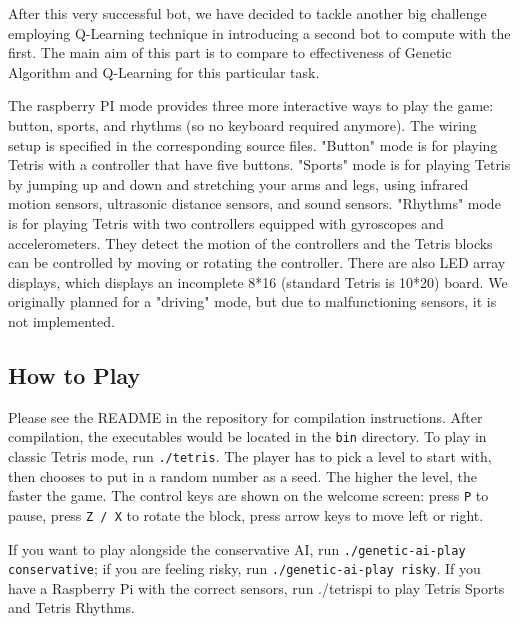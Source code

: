 \documentclass[11pt]{article}
\begin{document}
\begin{flushleft}
After this very successful bot, we have decided to tackle another big challenge employing Q-Learning technique in introducing a second bot to compute with the first. The main aim of this part is to compare to effectiveness of Genetic Algorithm and Q-Learning for this particular task.

\end{flushleft}

\begin{flushleft}
The raspberry PI mode provides three more interactive ways to play the game: button, sports, and rhythms (so no keyboard required anymore). The wiring setup is specified in the corresponding source files. "Button" mode is for playing Tetris with a controller that have five buttons. "Sports" mode is for playing Tetris by jumping up and down and stretching your arms and legs, using infrared motion sensors, ultrasonic distance sensors, and sound sensors. "Rhythms" mode is for playing Tetris with two controllers equipped with gyroscopes and accelerometers. They detect the motion of the controllers and the Tetris blocks can be controlled by moving or rotating the controller. There are also LED array displays, which displays an incomplete 8*16 (standard Tetris is 10*20) board. We originally planned for a "driving" mode, but due to malfunctioning sensors, it is not implemented. 
\end{flushleft}


\subsection{How to Play}

\begin{flushleft}
Please see the README in the repository for compilation instructions. After compilation, the executables would be located in the \texttt{bin} directory. To play in classic Tetris mode, run \texttt{./tetris}. The player has to pick a level to start with, then chooses to put in a random number as a seed. The higher the level, the faster the game. The control keys are shown on the welcome screen: press \texttt{P} to pause, press \texttt{Z / X} to rotate the block, press arrow keys to move left or right.
\end{flushleft}

\begin{flushleft}
If you want to play alongside the conservative AI, run \texttt{./genetic-ai-play conservative}; if you are feeling risky, run \texttt{./genetic-ai-play risky}. If you have a Raspberry Pi with the correct sensors, run ./tetrispi to play Tetris Sports and Tetris Rhythms. 
\end{flushleft}
\end{document}
